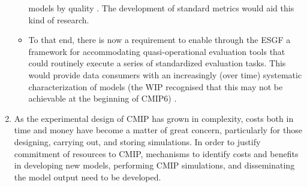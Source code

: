 \documentclass[gmd,manuscript]{copernicus}
\newcommand{\pipref}[1] {\citep{ref:#1}}
\begin{document}
\begin{enumerate}
\begin{itemize}
    models by quality \pipref{knuttietal2017}. The development of
    standard metrics would aid this kind of research.
  \item To that end, there is now a requirement to enable through the
    ESGF a framework for accommodating quasi-operational evaluation
    tools that could routinely execute a series of standardized
    evaluation tasks. This would provide data consumers with an
    increasingly (over time) systematic characterization of models
    (the WIP recognised that this may not be achievable at the
    beginning of CMIP6) .
  \end{itemize}
\item As the experimental design of CMIP has grown in complexity,
  costs both in time and money have become a matter of great concern,
  particularly for those designing, carrying out, and storing
  simulations. In order to justify commitment of resources to CMIP,
  mechanisms to identify costs and benefits in developing new models,
  performing CMIP simulations, and disseminating the model output need
  to be developed.


\end{enumerate}
\end{document}
